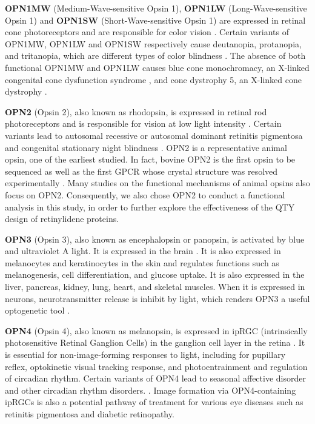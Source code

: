\documentclass[fleqn, 10pt, lineno]{manuscript}
\begin{document}
\textbf{OPN1MW} (Medium-Wave-sensitive Opsin 1), \textbf{OPN1LW} (Long-Wave-sensitive Opsin 1) and \textbf{OPN1SW} (Short-Wave-sensitive Opsin 1) are expressed in retinal cone photoreceptors and are responsible for color vision \citep{Bowmaker_1980}. Certain variants of OPN1MW, OPN1LW and OPN1SW respectively cause deutanopia, protanopia, and tritanopia, which are different types of color blindness \citep{Ueyama_2002, Baraas_2012}. The absence of both functional OPN1MW and OPN1LW causes blue cone monochromacy, an X-linked congenital cone dysfunction syndrome \citep{Wissinger_2022}, and cone dystrophy 5, an X-linked cone dystrophy \citep{Gardner_2010}. 

\textbf{OPN2} (Opsin 2), also known as rhodopsin, is expressed in retinal rod photoreceptors and is responsible for vision at low light intensity \citep{Hubbard_1958}. Certain variants lead to autosomal recessive or autosomal dominant retinitis pigmentosa and congenital stationary night blindness \citep{Fanelli_2021}. OPN2 is a representative animal opsin, one of the earliest studied. In fact, bovine OPN2 is the first opsin to be sequenced \citep{Nathans_1984} as well as the first GPCR whose crystal structure was resolved experimentally \citep{Palczeski_2000}. Many studies on the functional mechanisms of animal opsins also focus on OPN2. Consequently, we also chose OPN2 to conduct a functional analysis in this study, in order to further explore the effectiveness of the QTY design of retinylidene proteins. 

\textbf{OPN3} (Opsin 3), also known as encephalopsin or panopsin, is activated by blue and ultraviolet A light. It is expressed in the brain \citep{Blackshaw_1999}. It is also expressed in melanocytes and keratinocytes in the skin and regulates functions such as melanogenesis, cell differentiation, and glucose uptake. It is also expressed in the liver, pancreas, kidney, lung, heart, and skeletal muscles. When it is expressed in neurons, neurotransmitter release is inhibit by light, which renders OPN3 a useful optogenetic tool \citep{Copits_2021}. 

\textbf{OPN4} (Opsin 4), also known as melanopsin, is expressed in ipRGC (intrinsically photosensitive Retinal Ganglion Cells) in the ganglion cell layer in the retina \citep{Provencio_1998}. It is essential for non-image-forming responses to light, including for pupillary reflex, optokinetic visual tracking response, and photoentrainment and regulation of circadian rhythm. Certain variants of OPN4 lead to seasonal affective disorder and other circadian rhythm disorders.  \citep{Berson_2002}. Image formation via OPN4-containing ipRGCs is also a potential pathway of treatment for various eye diseases such as retinitis pigmentosa and diabetic retinopathy. 
\end{document}
